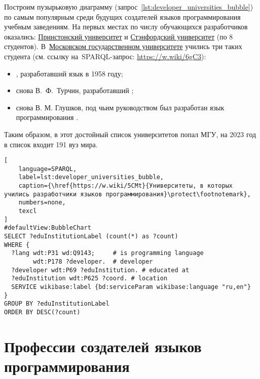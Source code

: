 Построим пузырьковую диаграмму (запрос~\ref{lst:developer_universities_bubble}) 
по самым популярным среди будущих создателей языков программирования учебным заведениям. 
На первых местах по числу обучающихся разработчиков оказались: 
\href{https://www.wikidata.org/wiki/Q21578}{Принстонский университет} и 
\href{https://www.wikidata.org/wiki/Q41506}{Стэнфордский университет} (по 8 студентов). 
В~\href{https://ru.wikipedia.org/wiki/Московский_государственный_университет}{Московском государственном университете} 
учились три таких студента 
(см. ссылку на~SPARQL-запрос: \href{https://w.wiki/6gC3}{https://w.wiki/6gC3}):
\begin{itemize}
    \item {}, разработавший язык  в 1958 году;

    \item снова В.~Ф.~Турчин, разработавший ;

    \item снова В. М. Глушков, под чьим руководством был разработан 
        язык программирования .
\end{itemize}
Таким образом, в этот достойный список университетов попал МГУ, 
на 2023 год в список входит 191 вуз мира.



\newpage
\begin{lstlisting}[
	language=SPARQL,
	label=lst:developer_universities_bubble,
    caption={\href{https://w.wiki/5CMt}{Университеты, в которых учились разработчики языков программирования}\protect\footnotemark},
    numbers=none,
	texcl
]
#defaultView:BubbleChart
SELECT ?eduInstitutionLabel (count(*) as ?count) 
WHERE {
  ?lang wdt:P31 wd:Q9143;     # is programming language
        wdt:P178 ?developer.  # developer
  ?developer wdt:P69 ?eduInstitution. # educated at
  ?eduInstitution wdt:P625 ?coord. # location
  SERVICE wikibase:label {bd:serviceParam wikibase:language "ru,en"}
}
GROUP BY ?eduInstitutionLabel
ORDER BY DESC(?count)
\end{lstlisting}




\section{Профессии создателей языков программирования}

